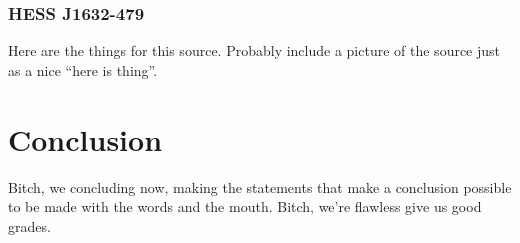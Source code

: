 \documentclass[a4paper, titlepage, oneside]{article}
\begin{document}
\begin{multicols}{2}
\subsubsection{HESS J1632-479}
Here are the things for this source. Probably include a picture of the source just as a nice ``here is thing''.

\section{Conclusion}
Bitch, we concluding now, making the statements that make a conclusion possible to be made with the words and the mouth. Bitch, we're flawless give us good grades.
\end{multicols}

\printbibliography[heading=bibintoc]
\end{document}
